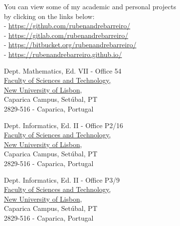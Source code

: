 \documentclass[10pt,a4paper,academicons]{altacv}
\begin{document}
\divider

{\footnotesize You can view some of my academic and personal projects\\
by clicking on the links below:\\
- \href{https://github.com/rubenandrebarreiro/}{https://github.com/rubenandrebarreiro/}\\
- \href{https://gitlab.com/rubenandrebarreiro/}{https://gitlab.com/rubenandrebarreiro/}\\
- \href{https://bitbucket.org/rubenandrebarreiro/}{https://bitbucket.org/rubenandrebarreiro/}\\
- \href{https://rubenandrebarreiro.github.io/}{https://rubenandrebarreiro.github.io/}\\
}

\divider


{Dept. Mathematics, Ed. VII - Office 54\\\href{https://www.fct.unl.pt/}{Faculty of Sciences and Technology,\\New University of Lisbon},\\Caparica Campus, Setúbal, PT\\2829-516 - Caparica, Portugal}

\divider

{Dept. Informatics, Ed. II - Office P2/16\\\href{https://www.fct.unl.pt/}{Faculty of Sciences and Technology,\\New University of Lisbon},\\Caparica Campus, Setúbal, PT\\2829-516 - Caparica, Portugal}

\divider

{Dept. Informatics, Ed. II - Office P3/9\\\href{https://www.fct.unl.pt/}{Faculty of Sciences and Technology,\\New University of Lisbon},\\Caparica Campus, Setúbal, PT\\2829-516 - Caparica, Portugal}
\end{document}
